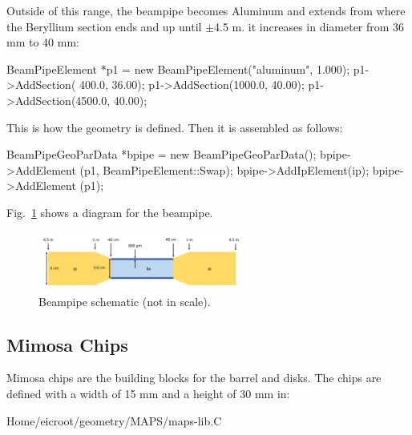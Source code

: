 \documentclass[12pt]{article}
\begin{document}
Outside of this range, the beampipe becomes Aluminum and extends from where the Beryllium section ends and up until $\pm$4.5 m.
it increases in diameter from 36 mm to 40 mm:

\begin{tcolorbox}
\begin{verbnobox}[\scriptsize]
BeamPipeElement *p1 = new BeamPipeElement("aluminum", 1.000);
p1->AddSection( 400.0,  36.00);
p1->AddSection(1000.0,  40.00);
p1->AddSection(4500.0,  40.00);
\end{verbnobox}  
\end{tcolorbox}

This is how the geometry is defined. Then it is assembled as follows:

\begin{tcolorbox}
\begin{verbnobox}[\scriptsize]
BeamPipeGeoParData *bpipe = new BeamPipeGeoParData();
bpipe->AddElement  (p1, BeamPipeElement::Swap);
bpipe->AddIpElement(ip);
bpipe->AddElement  (p1);
\end{verbnobox}  
\end{tcolorbox}

Fig.~\ref{fig:beampipe} shows a diagram for the beampipe.

\begin{figure}[H]
\centering
\includegraphics[width=0.6\textwidth]{figures/beampipe.pdf}
\caption{Beampipe schematic (not in scale).}
\label{fig:beampipe}
\end{figure}

\subsection{Mimosa Chips}
\label{sec:mimosa}

Mimosa chips are the building blocks for the barrel and disks.
The chips are defined with a width of 15 mm and a height of 30 mm in:

\begin{tcolorbox}
\begin{verbnobox}
Home/eicroot/geometry/MAPS/maps-lib.C
\end{verbnobox}  
\end{tcolorbox}
\end{document}

